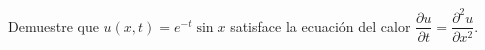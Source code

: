 Demuestre que $u(x, t) = e^{-t}\sin x$ satisface la ecuación del calor $\dfrac{\partial u}{\partial t} = \dfrac{\partial^2 u}{\partial x^2}$.
